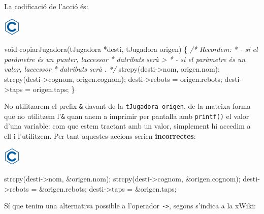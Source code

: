 \documentclass[
]{book}
\newenvironment{Shaded}{\begin{snugshade}}{\end{snugshade}}
\newcommand{\CommentTok}[1]{\textcolor[rgb]{0.56,0.35,0.01}{\textit{#1}}}
\newcommand{\DataTypeTok}[1]{\textcolor[rgb]{0.13,0.29,0.53}{#1}}
\newcommand{\NormalTok}[1]{#1}
\begin{document}
La codificació de l'acció és:

\includegraphics{./img/c.png}

\begin{Shaded}
\begin{Highlighting}[]
\DataTypeTok{void}\NormalTok{ copiarJugadora(tJugadora *desti, tJugadora origen) \{}
    \CommentTok{/* Recordem: }
\CommentTok{     * {-} si el paràmetre és un punter, l\textquotesingle{}accessor }
\CommentTok{     *   d\textquotesingle{}atributs serà \textquotesingle{}{-}\textgreater{}\textquotesingle{}}
\CommentTok{     * {-} si el paràmetre és un valor, l\textquotesingle{}accessor}
\CommentTok{     *   d\textquotesingle{}atributs serà \textquotesingle{}.\textquotesingle{}}
\CommentTok{     */}
\NormalTok{    strcpy(desti{-}\textgreater{}nom, origen.nom);}
\NormalTok{    strcpy(desti{-}\textgreater{}cognom, origen.cognom);}
\NormalTok{    desti{-}\textgreater{}rebots = origen.rebots;}
\NormalTok{    desti{-}\textgreater{}taps = origen.taps;}
\NormalTok{\}}
\end{Highlighting}
\end{Shaded}

No utilitzarem el prefix \texttt{\&} davant de la \texttt{tJugadora\ origen}, de la mateixa forma que no utilitzem l'\texttt{\&} quan anem a imprimir per pantalla amb \texttt{printf()} el valor d'una variable: com que estem tractant amb un valor, simplement hi accedim a ell i l'utilitzem. Per tant aquestes accions serien \textbf{incorrectes}:

\includegraphics{./img/c.png}

\begin{Shaded}
\begin{Highlighting}[]
\NormalTok{    strcpy(desti{-}\textgreater{}nom, \&origen.nom);}
\NormalTok{    strcpy(desti{-}\textgreater{}cognom, \&origen.cognom);}
\NormalTok{    desti{-}\textgreater{}rebots = \&origen.rebots;}
\NormalTok{    desti{-}\textgreater{}taps = \&origen.taps;}
\end{Highlighting}
\end{Shaded}

Sí que tenim una alternativa possible a l'operador \texttt{-\textgreater{}}, segons s'indica a la xWiki:
\end{document}
